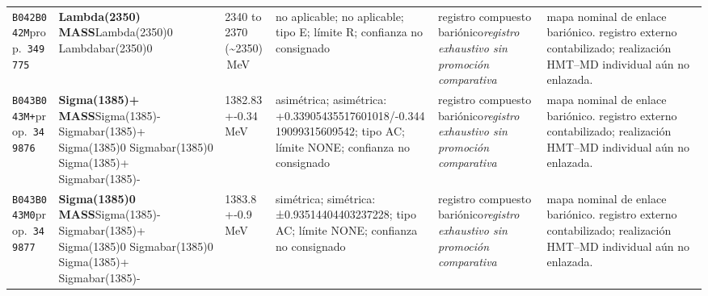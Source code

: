 \begin{landscape}
\begin{longtable}{L{1.85cm}L{4.45cm}L{2.35cm}L{4.05cm}L{3.35cm}L{7.15cm}}
\texttt{B042}\newline \texttt{B042M}\newline prop.\ \texttt{349775} & \textbf{Lambda(2350) MASS}\newline Lambda(2350)0 \textbar{}\allowbreak{} Lambdabar(2350)0 & 2340 to 2370 (\textasciitilde{}2350)\,MeV & no aplicable; no aplicable; tipo E; límite R; confianza no consignado & registro compuesto bariónico\newline \emph{registro exhaustivo sin promoción comparativa} & mapa nominal de enlace bariónico. registro externo contabilizado; realización HMT--MD individual aún no enlazada. \\
\texttt{B043}\newline \texttt{B043M+}\newline prop.\ \texttt{349876} & \textbf{Sigma(1385)+ MASS}\newline Sigma(1385)- \textbar{}\allowbreak{} Sigmabar(1385)+ \textbar{}\allowbreak{} Sigma(1385)0 \textbar{}\allowbreak{} Sigmabar(1385)0 \textbar{}\allowbreak{} Sigma(1385)+ \textbar{}\allowbreak{} Sigmabar(1385)- & 1382.83+-0.34\,MeV & asimétrica; asimétrica: +0.33905435517601018/-0.34419099315609542; tipo AC; límite NONE; confianza no consignado & registro compuesto bariónico\newline \emph{registro exhaustivo sin promoción comparativa} & mapa nominal de enlace bariónico. registro externo contabilizado; realización HMT--MD individual aún no enlazada. \\
\texttt{B043}\newline \texttt{B043M0}\newline prop.\ \texttt{349877} & \textbf{Sigma(1385)0 MASS}\newline Sigma(1385)- \textbar{}\allowbreak{} Sigmabar(1385)+ \textbar{}\allowbreak{} Sigma(1385)0 \textbar{}\allowbreak{} Sigmabar(1385)0 \textbar{}\allowbreak{} Sigma(1385)+ \textbar{}\allowbreak{} Sigmabar(1385)- & 1383.8+-0.9\,MeV & simétrica; simétrica: ±0.93514404403237228; tipo AC; límite NONE; confianza no consignado & registro compuesto bariónico\newline \emph{registro exhaustivo sin promoción comparativa} & mapa nominal de enlace bariónico. registro externo contabilizado; realización HMT--MD individual aún no enlazada. \\

\end{longtable}
\end{landscape}
